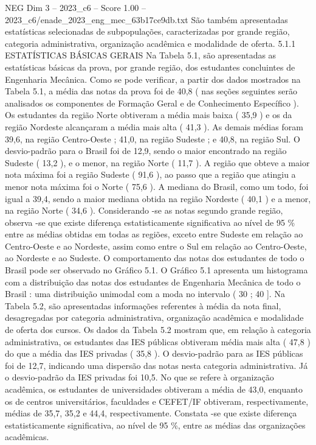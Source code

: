 \begin{textsample}{NEG Dim 3 – 2023\_c6 – Score 1.00 – 2023\_c6/enade\_2023\_eng\_mec\_63b17ce9db.txt}
São também apresentadas estatísticas selecionadas de subpopulações, caracterizadas por grande região, categoria administrativa, organização acadêmica e modalidade de oferta. 5.1.1 ESTATÍSTICAS BÁSICAS GERAIS Na Tabela 5.1, são apresentadas as estatísticas básicas da prova, por grande região, dos estudantes concluintes de Engenharia Mecânica.
Como se pode verificar, a partir dos dados mostrados na Tabela 5.1, a média das notas da prova foi de 40,8 ( nas seções seguintes serão analisados os componentes de Formação Geral e de Conhecimento Específico ).
Os estudantes da região Norte obtiveram a média mais baixa ( 35,9 ) e os da região Nordeste alcançaram a média mais alta ( 41,3 ).
As demais médias foram 39,6, na região Centro-Oeste ; 41,0, na região Sudeste ; e 40,8, na região Sul.
O desvio-padrão para o Brasil foi de 12,9, sendo o maior encontrado na região Sudeste ( 13,2 ), e o menor, na região Norte ( 11,7 ).
A região que obteve a maior nota máxima foi a região Sudeste ( 91,6 ), ao passo que a região que atingiu a menor nota máxima foi o Norte ( 75,6 ).
A mediana do Brasil, como um todo, foi igual a 39,4, sendo a maior mediana obtida na região Nordeste ( 40,1 ) e a menor, na região Norte ( 34,6 ).
Considerando -se as notas segundo grande região, observa -se que existe diferença estatisticamente significativa ao nível de 95 \% entre as médias obtidas em todas as regiões, exceto entre Sudeste em relação ao Centro-Oeste e ao Nordeste, assim como entre o Sul em relação ao Centro-Oeste, ao Nordeste e ao Sudeste.
O comportamento das notas dos estudantes de todo o Brasil pode ser observado no Gráfico 5.1.
O Gráfico 5.1 apresenta um histograma com a distribuição das notas dos estudantes de Engenharia Mecânica de todo o Brasil : uma distribuição unimodal com a moda no intervalo ( 30 ; 40 ].
Na Tabela 5.2, são apresentadas informações referentes à média da nota final, desagregadas por categoria administrativa, organização acadêmica e modalidade de oferta dos cursos.
Os dados da Tabela 5.2 mostram que, em relação à categoria administrativa, os estudantes das IES públicas obtiveram média mais alta ( 47,8 ) do que a média das IES privadas ( 35,8 ).
O desvio-padrão para as IES públicas foi de 12,7, indicando uma dispersão das notas nesta categoria administrativa.
Já o desvio-padrão da IES privadas foi 10,5.
No que se refere à organização acadêmica, os estudantes de universidades obtiveram a média de 43,0, enquanto os de centros universitários, faculdades e CEFET/IF obtiveram, respectivamente, médias de 35,7, 35,2 e 44,4, respectivamente.
Constata -se que existe diferença estatisticamente significativa, ao nível de 95 \%, entre as médias das organizações acadêmicas.

\end{textsample}
